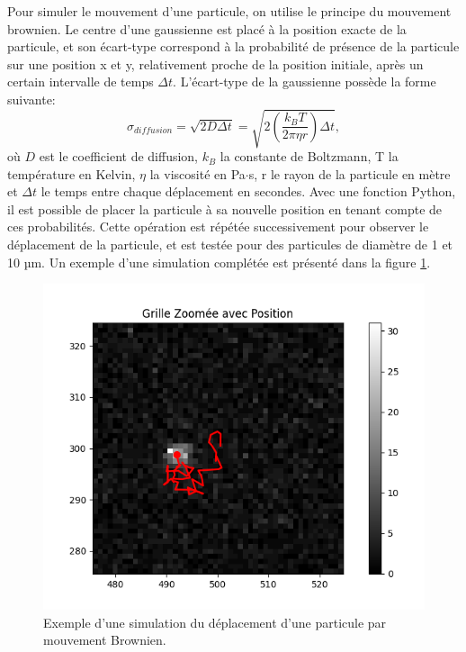 \documentclass[conference]{IEEEtran}
\begin{document}
Pour simuler le mouvement d'une particule, on utilise le principe du mouvement brownien.
Le centre d'une gaussienne est placé à la position exacte de la particule, et son écart-type correspond à la probabilité de présence de la particule sur une position x et y, 
relativement proche de la position initiale, après un certain intervalle de temps $\Delta t$. L'écart-type de la gaussienne possède la forme suivante:
\begin{equation}
  \sigma_{diffusion} = \sqrt{2D\Delta t} = \sqrt{2\left ( \frac{k_{B}T}{2\pi \eta r} \right )\Delta t},
\end{equation}
où $D$ est le coefficient de diffusion, $k_{B}$ la constante de Boltzmann, T la température en Kelvin, $\eta$ la viscosité en Pa$\cdot$s, r le rayon de la particule en mètre et $\Delta t$ le temps entre chaque déplacement en secondes. 
Avec une fonction Python, il est possible de placer la particule à sa nouvelle position en tenant compte de ces probabilités. Cette opération est répétée successivement pour observer 
le déplacement de la particule, et est testée pour des particules de diamètre de 1 et 10 µm. Un exemple d'une simulation complétée est présenté dans la figure \ref{simu}.
\begin{figure}
  \centering
  \includegraphics[scale=0.5]{Blob-lamb=405nm-Mtheo=60-NA=0,85-Taille=1um.png}
  \caption{Exemple d'une simulation du déplacement d'une particule par mouvement Brownien.}
  \label{simu}
\end{figure}
\end{document}
